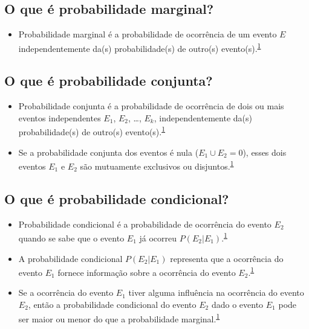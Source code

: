 \documentclass[
  a4paper,
]{book}
\providecommand{\tightlist}{%
  \setlength{\itemsep}{0pt}\setlength{\parskip}{0pt}}
\begin{document}
\hypertarget{o-que-uxe9-probabilidade-marginal}{%
\subsection{O que é probabilidade marginal?}\label{o-que-uxe9-probabilidade-marginal}}

\begin{itemize}
\tightlist
\item
  Probabilidade marginal é a probabilidade de ocorrência de um evento \(E\) independentemente da(s) probabilidade(s) de outro(s) evento(s).\textsuperscript{\protect\hyperlink{ref-grami2023}{1}}
\end{itemize}

\hypertarget{o-que-uxe9-probabilidade-conjunta}{%
\subsection{O que é probabilidade conjunta?}\label{o-que-uxe9-probabilidade-conjunta}}

\begin{itemize}
\item
  Probabilidade conjunta é a probabilidade de ocorrência de dois ou mais eventos independentes \(E_{1}\), \(E_{2}\), \ldots, \(E_{k}\), independentemente da(s) probabilidade(s) de outro(s) evento(s).\textsuperscript{\protect\hyperlink{ref-grami2023}{1}}
\item
  Se a probabilidade conjunta dos eventos é nula (\(E_{1} \cup E_{2} = 0\)), esses dois eventos \(E_{1}\) e \(E_{2}\) são mutuamente exclusivos ou disjuntos.\textsuperscript{\protect\hyperlink{ref-grami2023}{1}}
\end{itemize}

\hypertarget{o-que-uxe9-probabilidade-condicional}{%
\subsection{O que é probabilidade condicional?}\label{o-que-uxe9-probabilidade-condicional}}

\begin{itemize}
\item
  Probabilidade condicional é a probabilidade de ocorrência do evento \(E_{2}\) quando se sabe que o evento \(E_{1}\) já ocorreu \(P(E_{2} | E_{1})\).\textsuperscript{\protect\hyperlink{ref-grami2023}{1}}
\item
  A probabilidade condicional \(P(E_{2} | E_{1})\) representa que a ocorrência do evento \(E_{1}\) fornece informação sobre a ocorrência do evento \(E_{2}\).\textsuperscript{\protect\hyperlink{ref-grami2023}{1}}
\item
  Se a ocorrência do evento \(E_{1}\) tiver alguma influência na ocorrência do evento \(E_{2}\), então a probabilidade condicional do evento \(E_{2}\) dado o evento \(E_{1}\) pode ser maior ou menor do que a probabilidade marginal.\textsuperscript{\protect\hyperlink{ref-grami2023}{1}}
\end{itemize}
\end{document}
